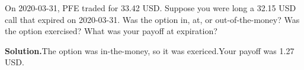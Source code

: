 \noindent On 2020-03-31, PFE traded for 33.42 USD. Suppose you were long a 32.15 USD call that expired on 2020-03-31. Was the option in, at, or out-of-the-money? Was the option exercised? What was your payoff at expiration?

\vspace{9pt} 

\textbf{Solution.}The option was in-the-money, so it was exericed.Your payoff was 1.27 USD.
